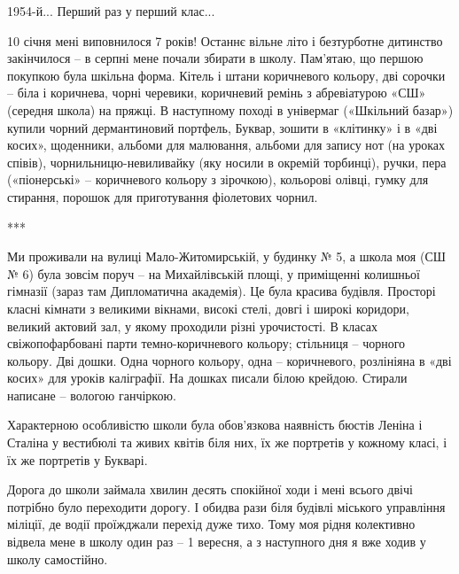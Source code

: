 1954-й... Перший раз у перший клас...

10 січня мені виповнилося 7 років! Останнє вільне літо і безтурботне дитинство
закінчилося – в серпні мене почали збирати в школу. Пам’ятаю, що першою
покупкою була шкільна форма. Кітель і штани коричневого кольору, дві сорочки –
біла і коричнева, чорні черевики, коричневий ремінь з абревіатурою «СШ»
(середня школа) на пряжці. В наступному поході в універмаг («Шкільний базар»)
купили чорний дермантиновий портфель, Буквар, зошити в «клітинку» і в «дві
косих», щоденники, альбоми для малювання, альбоми для запису нот (на уроках
співів), чорнильницю-невиливайку (яку носили в окремій торбинці), ручки, пера
(«піонерські» – коричневого кольору з зірочкою), кольорові олівці, гумку для
стирання, порошок для приготування фіолетових чорнил.

***

Ми проживали на вулиці Мало-Житомирській, у будинку № 5, а школа моя (СШ № 6)
була зовсім поруч – на Михайлівській площі, у приміщенні колишньої гімназії
(зараз там Дипломатична академія). Це була красива будівля. Просторі класні
кімнати з великими вікнами, високі стелі, довгі і широкі коридори, великий
актовий зал, у якому проходили різні урочистості. В класах свіжопофарбовані
парти темно-коричневого кольору; стільниця – чорного кольору. Дві дошки. Одна
чорного кольору, одна – коричневого, розлініяна в «дві косих» для уроків
каліграфії. На дошках писали білою крейдою. Стирали написане – вологою
ганчіркою. 

Характерною особливістю школи була обов’язкова наявність бюстів Леніна і
Сталіна у вестибюлі та живих квітів біля них, їх же портретів у кожному класі,
і їх же портретів у Букварі.


Дорога до школи займала хвилин десять спокійної ходи і мені всього двічі
потрібно було переходити дорогу. І обидва рази біля будівлі міського управління
міліції, де водії проїжджали перехід дуже тихо. Тому моя рідня колективно
відвела мене в школу один раз – 1 вересня, а з наступного дня я вже ходив у
школу самостійно.

